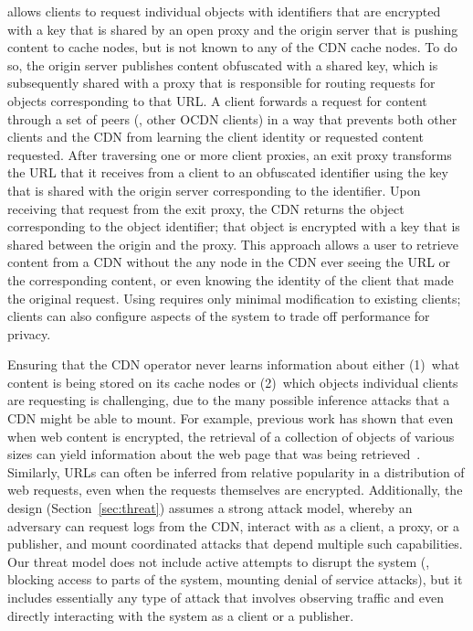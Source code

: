 \system{} allows clients to request individual objects with identifiers that
are encrypted with a key that is shared by an open proxy and the origin server
that is pushing content to cache nodes, but is not known to any of the CDN
cache nodes.  To do so, the origin server publishes content obfuscated with a
shared key, which is subsequently shared with a proxy that is responsible for
routing requests for objects corresponding to that URL.  A client forwards a
request for content through a set of peers (\ie, other OCDN clients) in a way
that prevents both other clients  and the CDN from learning the client
identity or requested content requested.  After traversing one or more client
proxies, an exit proxy transforms the URL that it receives from a client to an
obfuscated identifier using the key that is shared with the origin server
corresponding to the identifier.  Upon receiving that request from the exit
proxy, the CDN returns the object corresponding to the object identifier; that
object is encrypted with a key that is shared between the origin and the
proxy. This approach allows a user to retrieve content from a CDN without the
any node in the CDN ever seeing the URL or the corresponding content, or even knowing
the identity of the client that made the original request. Using \system{} requires
only minimal modification to existing clients; clients can also configure aspects
of the system to trade off performance for privacy.

Ensuring that the CDN operator never learns information about either (1)~what
content is being stored on its cache nodes or (2)~which objects individual
clients are requesting is challenging, due to the many possible inference
attacks that a CDN might be able to mount. For example, previous work has
shown that even when web content is encrypted, the retrieval of a collection
of objects of various sizes can yield information about the web page that was
being retrieved~\cite{panchenko2016website, cai2012touching}. Similarly, URLs
can often be inferred from relative popularity in a distribution of web
requests, even when the requests themselves are encrypted. Additionally, the
\system{} design (Section~\ref{sec:threat}) assumes a strong attack model,
whereby an adversary can request logs from the CDN, interact with \system{} as
a client, a proxy, or a publisher, and mount coordinated attacks that depend
multiple such capabilities. Our threat model does not include active attempts
to disrupt the system (\eg, blocking access to parts of the system, mounting
denial of service attacks), but it includes essentially any type of attack
that involves observing traffic and even directly interacting with the system
as a client or a publisher.

